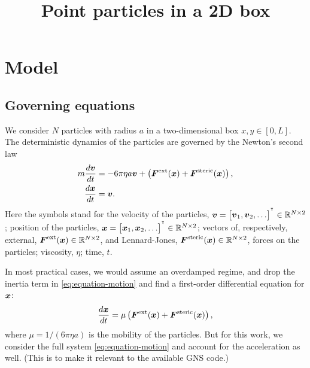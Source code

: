 \documentclass[letterpaper, 11pt]{article}
\title{Point particles in a 2D box}
\newcommand{\Set}[1]{\mathbb{#1}}
\newcommand{\tp}{^\intercal}
\begin{document}
\date{}
\maketitle
\thispagestyle{empty}
\section{Model}
\subsection{Governing equations}
We consider $N$ particles with radius $a$ in a two-dimensional box $x,y\in[0,L]$. The deterministic dynamics of the particles are governed by the Newton's second law
\begin{subequations}
\begin{align}
  m\frac{d\boldsymbol{v}}{dt}&=-6\pi\eta a\boldsymbol{v}+\left(\boldsymbol{F}^{\text{ext}}(\boldsymbol{x})+\boldsymbol{F}^{\text{steric}}(\boldsymbol{x})\right),\\
  \frac{d\boldsymbol{x}}{dt}&=\boldsymbol{v}.
\end{align}
\label{eq:equation-motion}%
\end{subequations}
Here the symbols stand for the velocity of the particles, $\V{v}=\begin{bmatrix}\V{v}_1,\V{v}_2,\dots\end{bmatrix}^{\tp}\in\Set{R}^{N\times 2}$; position of the particles, $\V{x}=\begin{bmatrix}\V{x}_1,\V{x}_2,\dots\end{bmatrix}^{\tp}\in\Set{R}^{N\times 2}$; vectors of, respectively, external, $\V{F}^{\text{ext}}(\V{x})\in\Set{R}^{N\times 2}$, and Lennard-Jones, $\V{F}^{\text{steric}}(\V{x})\in\Set{R}^{N\times 2}$, forces on the particles; viscosity, $\eta$; time, $t$.

In most practical cases, we would assume an overdamped regime, and drop the inertia term in \eqref{eq:equation-motion} and find a first-order differential equation for $\boldsymbol{x}$:
\begin{equation}
  \frac{d\boldsymbol{x}}{dt}=\mu\left(\boldsymbol{F}^{\text{ext}}(\boldsymbol{x})+\boldsymbol{F}^{\text{steric}}(\boldsymbol{x})\right),
  \label{eq:equation-motion-overdamped}
\end{equation}
where $\mu=1/(6\pi\eta a)$ is the mobility of the particles. But for this work, we consider the full system \ref{eq:equation-motion} and account for the acceleration as well. (This is to make it relevant to the available GNS code.)
\end{document}
